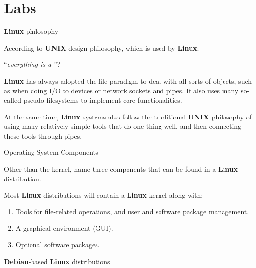 \clearpage\section{Labs}\begin{Lab}

\begin{exe} {\textbf{Linux} philosophy}

   According to \textbf{UNIX} design philosophy, which is
   used by \textbf{Linux}:

   ``\textit{everything is a \underline{\hspace*{4em}}}''?

   \begin{sol}

      \textbf{Linux} has always adopted the file paradigm to
      deal with all sorts of objects, such as when doing I/O
      to devices or network sockets and pipes.  It also uses
      many so-called pseudo-filesystems to implement core
      functionalities.

      At the same time, \textbf{Linux} systems also follow
      the traditional \textbf{UNIX} philosophy of using many
      relatively simple tools that do one thing well, and
      then connecting these tools through pipes.

   \end{sol}
\end{exe}

\begin{exe} {Operating System Components}

   Other than the kernel, name three components that can be
   found in a \textbf{Linux} distribution.

   \begin{sol}

      Most \textbf{Linux} distributions will contain a
      \textbf{Linux} kernel along with:
      \begin{enumerate}
         \item
         Tools for file-related operations, and user and
         software package management.
         \item
         A graphical environment (GUI).
         \item
         Optional software packages.
      \end{enumerate}
   \end{sol}
\end{exe}

\begin{exe} {\textbf{Debian}-based \textbf{Linux} distributions}


\end{exe}
\end{Lab}
